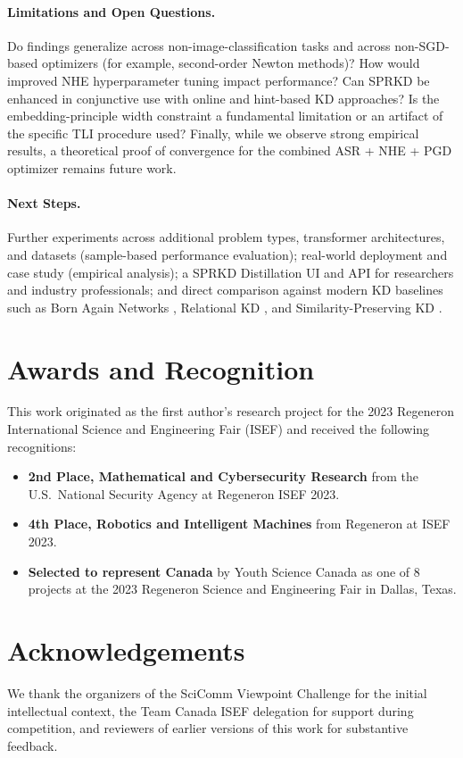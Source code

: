 \documentclass[letterpaper]{article}
\begin{document}
\paragraph{Limitations and Open Questions.}
Do findings generalize across non-image-classification tasks and across non-SGD-based optimizers (for example, second-order Newton methods)? How would improved NHE hyperparameter tuning impact performance? Can SPRKD be enhanced in conjunctive use with online and hint-based KD approaches? Is the embedding-principle width constraint a fundamental limitation or an artifact of the specific TLI procedure used? Finally, while we observe strong empirical results, a theoretical proof of convergence for the combined ASR + NHE + PGD optimizer remains future work.

\paragraph{Next Steps.}
Further experiments across additional problem types, transformer architectures, and datasets (sample-based performance evaluation); real-world deployment and case study (empirical analysis); a SPRKD Distillation UI and API for researchers and industry professionals; and direct comparison against modern KD baselines such as Born Again Networks \citep{furlanello2018born}, Relational KD \citep{park2019relational}, and Similarity-Preserving KD \citep{tung2019similarity}.

\section*{Awards and Recognition}
This work originated as the first author's research project for the 2023 Regeneron International Science and Engineering Fair (ISEF) and received the following recognitions:
\begin{itemize}
    \item \textbf{2nd Place, Mathematical and Cybersecurity Research} from the U.S.~National Security Agency at Regeneron ISEF 2023.
    \item \textbf{4th Place, Robotics and Intelligent Machines} from Regeneron at ISEF 2023.
    \item \textbf{Selected to represent Canada} by Youth Science Canada as one of 8 projects at the 2023 Regeneron Science and Engineering Fair in Dallas, Texas.
\end{itemize}

\section*{Acknowledgements}
We thank the organizers of the SciComm Viewpoint Challenge for the initial intellectual context, the Team Canada ISEF delegation for support during competition, and reviewers of earlier versions of this work for substantive feedback.


\end{document}
